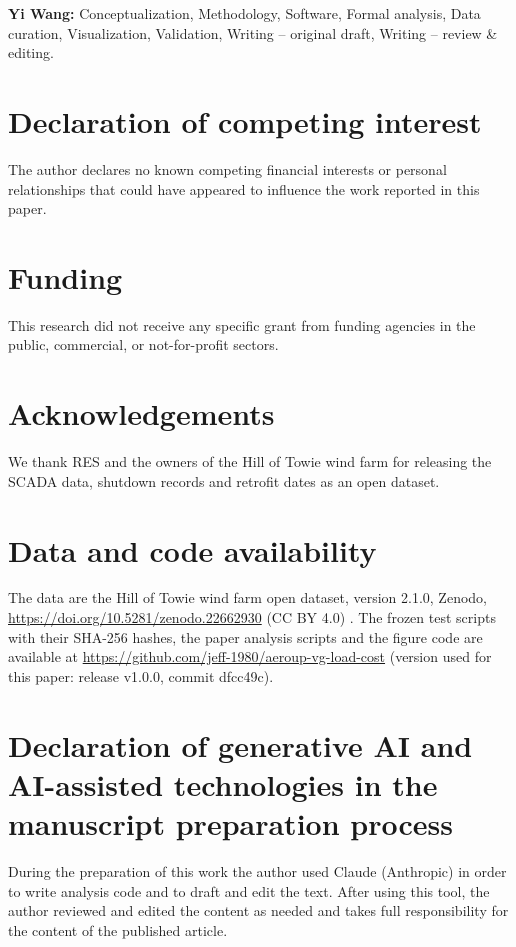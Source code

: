 \documentclass[preprint,12pt]{elsarticle}
\begin{document}
\textbf{Yi Wang:} Conceptualization, Methodology, Software, Formal analysis, Data curation, Visualization, Validation, Writing -- original draft, Writing -- review \& editing.

\section*{Declaration of competing interest}

The author declares no known competing financial interests or personal relationships that could have appeared to influence the work reported in this paper.

\section*{Funding}

This research did not receive any specific grant from funding agencies in the public, commercial, or not-for-profit sectors.

\section*{Acknowledgements}

We thank RES and the owners of the Hill of Towie wind farm for releasing the SCADA data, shutdown records and retrofit dates as an open dataset.

\section*{Data and code availability}

The data are the Hill of Towie wind farm open dataset, version 2.1.0, Zenodo, \url{https://doi.org/10.5281/zenodo.22662930} (CC BY 4.0) \cite{hot}. The frozen test scripts with their SHA-256 hashes, the paper analysis scripts and the figure code are available at \url{https://github.com/jeff-1980/aeroup-vg-load-cost} (version used for this paper: release v1.0.0, commit dfcc49c).

\section*{Declaration of generative AI and AI-assisted technologies in the manuscript preparation process}

During the preparation of this work the author used Claude (Anthropic) in order to write analysis code and to draft and edit the text. After using this tool, the author reviewed and edited the content as needed and takes full responsibility for the content of the published article.
\end{document}
